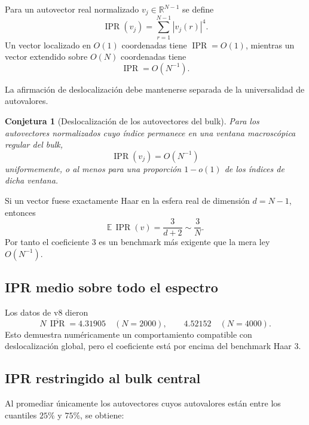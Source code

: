 \documentclass[11pt,a4paper]{article}
\newtheorem{conjecture}{Conjetura}
\newcommand{\IPR}{\operatorname{IPR}}
\begin{document}
Para un autovector real normalizado $v_j\in\mathbb R^{N-1}$ se define
\begin{equation}
\IPR(v_j)=\sum_{r=1}^{N-1}|v_j(r)|^4.
\end{equation}
Un vector localizado en $O(1)$ coordenadas tiene $\IPR=O(1)$, mientras un vector extendido sobre $O(N)$ coordenadas tiene
\begin{equation}
\IPR=O(N^{-1}).
\end{equation}

La afirmación de deslocalización debe mantenerse separada de la universalidad de autovalores.

\begin{conjecture}[Deslocalización de los autovectores del bulk]
\label{conj:ipr}
Para los autovectores normalizados cuyo índice permanece en una ventana macroscópica regular del bulk,
\begin{equation}
\boxed{
\IPR(v_j)=O(N^{-1})
}
\end{equation}
uniformemente, o al menos para una proporción $1-o(1)$ de los índices de dicha ventana.
\end{conjecture}

Si un vector fuese exactamente Haar en la esfera real de dimensión $d=N-1$, entonces
\begin{equation}
\mathbb E\,\IPR(v)=\frac{3}{d+2}\sim\frac3N.
\label{eq:haar-ipr}
\end{equation}
Por tanto el coeficiente $3$ es un benchmark más exigente que la mera ley $O(N^{-1})$.

\subsection{IPR medio sobre todo el espectro}

Los datos de v8 dieron
\begin{equation}
N\,\overline{\IPR}=4.31905\quad(N=2000),
\qquad
4.52152\quad(N=4000).
\end{equation}
Esto demuestra numéricamente un comportamiento compatible con deslocalización global, pero el coeficiente está por encima del benchmark Haar $3$.

\subsection{IPR restringido al bulk central}

Al promediar únicamente los autovectores cuyos autovalores están entre los cuantiles $25\%$ y $75\%$, se obtiene:
\end{document}

